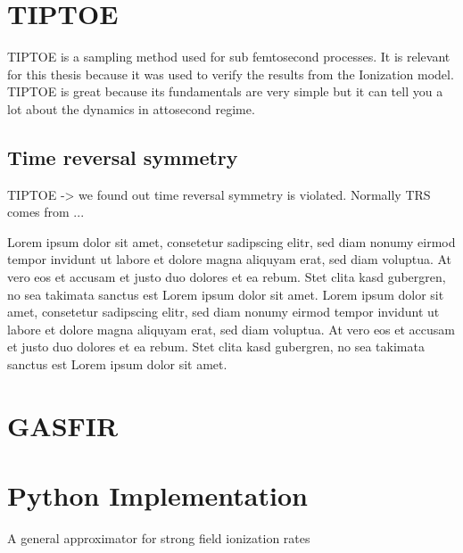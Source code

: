 \section{TIPTOE}
TIPTOE \cite{Park:18} is a sampling method used for sub femtosecond processes. It is relevant for this thesis because it was used to verify the results from the Ionization model. 
TIPTOE is great because its fundamentals are very simple but it can tell you a lot about the dynamics in attosecond regime. 

\subsection{Time reversal symmetry}
TIPTOE -> we found out time reversal symmetry is violated. Normally TRS comes from ...

Lorem ipsum dolor sit amet, consetetur sadipscing elitr, sed diam nonumy eirmod tempor invidunt ut labore et dolore magna aliquyam erat, sed diam voluptua. At vero eos et accusam et justo duo dolores et ea rebum. Stet clita kasd gubergren, no sea takimata sanctus est Lorem ipsum dolor sit amet. Lorem ipsum dolor sit amet, consetetur sadipscing elitr, sed diam nonumy eirmod tempor invidunt ut labore et dolore magna aliquyam erat, sed diam voluptua. At vero eos et accusam et justo duo dolores et ea rebum. Stet clita kasd gubergren, no sea takimata sanctus est Lorem ipsum dolor sit amet.
\section{GASFIR}
\section{Python Implementation}
A general approximator for strong field ionization rates